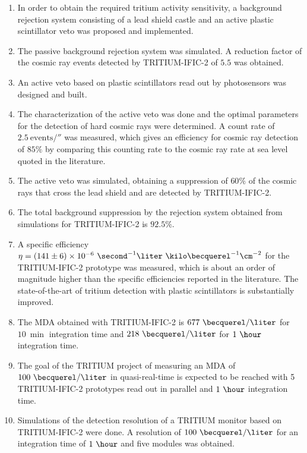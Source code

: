 \begin{enumerate}
\item{} In order to obtain the required tritium activity sensitivity, a background rejection system consisting of a lead shield castle and an active plastic scintillator veto was proposed and implemented.

\item{} The passive background rejection system was simulated. A reduction factor of the cosmic ray events detected by TRITIUM-IFIC-2 of $5.5$ was obtained.

\item{} An active veto based on plastic scintillators read out by photosensors was designed and built.

\item{} The characterization of the active veto was done and the optimal parameters for the detection of hard cosmic rays were determined. A count rate of $2.5~\text{events}/\second$ was measured, which gives an efficiency for cosmic ray detection of $85\%$ by comparing this counting rate to the cosmic ray rate at sea level quoted in the literature.

\item{} The active veto was simulated, obtaining a suppression of $60\%$ of the cosmic rays that cross the lead shield and are detected by TRITIUM-IFIC-2.

\item{} The total background suppression by the rejection system obtained from simulations for TRITIUM-IFIC-2 is $92.5\%$.

\item{} A specific efficiency $\eta = (141 \pm 6) \times 10^{-6}~ \second^{-1}  \liter ~ \kilo\becquerel^{-1} \cm^{-2}$ for the TRITIUM-IFIC-2  prototype was measured, which is about an order of magnitude higher than the specific efficiencies reported in the literature. The state-of-the-art of tritium detection with plastic scintillators is substantially improved.

\item{} The MDA obtained with TRITIUM-IFIC-2 is $677~\becquerel/\liter$  for $10~\min$ integration time and $218~\becquerel/\liter$ for $1~\hour$ integration time.

\item{} The goal of the TRITIUM project of measuring an MDA of $100~\becquerel/\liter$ in quasi-real-time is expected to be reached with 5 TRITIUM-IFIC-2 prototypes read out in parallel and $1~\hour$ integration time.

\item{} Simulations of the detection resolution of a TRITIUM monitor based on TRITIUM-IFIC-2 were done. A resolution of $100~\becquerel/\liter$ for an integration time of $1~\hour$ and five modules was obtained.


\end{enumerate}
